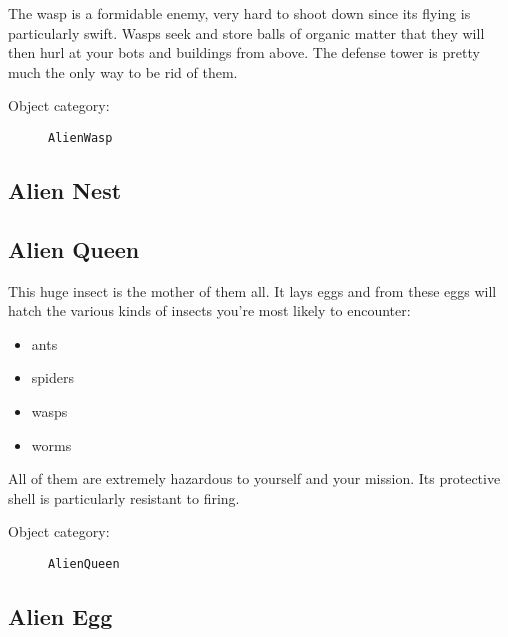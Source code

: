 The wasp is a formidable enemy, very hard to shoot down since its flying is particularly swift.
Wasps seek and store balls of organic matter that they will then hurl at your bots and buildings from above. The defense tower is pretty much the only way to be rid of them.

\begin{description}
    \item[Object category:] \texttt{AlienWasp}
\end{description}


\subsection{Alien Nest}



\subsection{Alien Queen}

This huge insect is the mother of them all. It lays eggs and from these eggs will hatch the various kinds of insects you're most likely to encounter:
\begin{itemize}
    \item ants
    \item spiders
    \item wasps
    \item worms
\end{itemize}
All of them are extremely hazardous to yourself and your mission.
Its protective shell is particularly resistant to firing.

\begin{description}
    \item[Object category:] \texttt{AlienQueen}
\end{description}


\subsection{Alien Egg}

